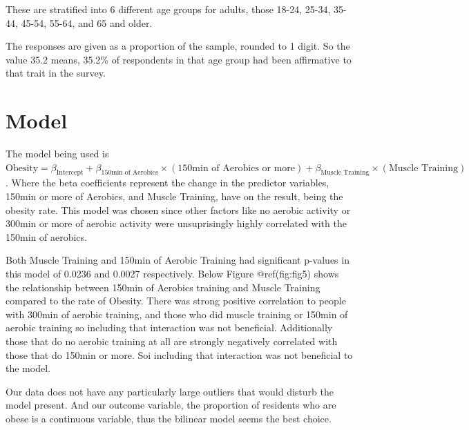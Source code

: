 \documentclass[
]{article}
\begin{document}
These are stratified into 6 different age groups for adults, those
18-24, 25-34, 35-44, 45-54, 55-64, and 65 and older.

The responses are given as a proportion of the sample, rounded to 1
digit. So the value 35.2 means, 35.2\% of respondents in that age group
had been affirmative to that trait in the survey.

\newpage

\hypertarget{Model}{%
\section{Model}\label{Model}}

The model being used is
\(\text{Obesity}=\beta_{\text{Intercept}}+\beta_{\text{150min of Aerobics}}\times (\text{150min of Aerobics or more})+\beta_{\text{Muscle Training}}\times (\text{Muscle Training})\).
Where the beta coefficients represent the change in the predictor
variables, 150min or more of Aerobics, and Muscle Training, have on the
result, being the obesity rate. This model was chosen since other
factors like no aerobic activity or 300min or more of aerobic activity
were unsuprisingly highly correlated with the 150min of aerobics.

Both Muscle Training and 150min of Aerobic Training had significant
p-values in this model of 0.0236 and 0.0027 respectively. Below Figure
@ref(fig:fig5) shows the relationship between 150min of Aerobics
training and Muscle Training compared to the rate of Obesity. There was
strong positive correlation to people with 300min of aerobic training,
and those who did muscle training or 150min of aerobic training so
including that interaction was not beneficial. Additionally those that
do no aerobic training at all are strongly negatively correlated with
those that do 150min or more. Soi including that interaction was not
beneficial to the model.

Our data does not have any particularly large outliers that would
disturb the model present. And our outcome variable, the proportion of
residents who are obese is a continuous variable, thus the bilinear
model seems the best choice.
\end{document}
